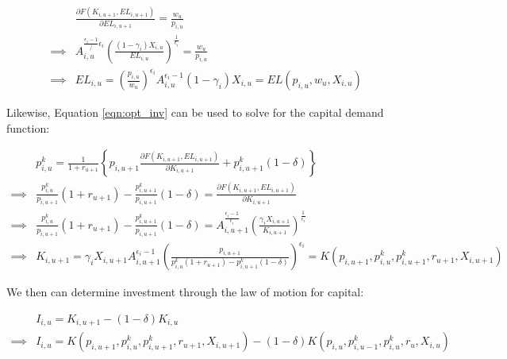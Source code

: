\documentclass[letterpaper,12pt]{article}
\theoremstyle{definition}
\begin{document}
\begin{spacing}{1.5}
\begin{equation}
\label{eqn:solve_dyn_l}
\begin{split}
 &\frac{\partial F(K_{i,u+1},EL_{i,u+1})}{\partial EL_{i,u+1}} =  \frac{w_{u}}{ p_{i,u}}  \\
 \implies & A_{i,u}^{\frac{\epsilon_{i}-1}/{\epsilon_{i}}}\left( \frac{(1-\gamma_{i})X_{i,u}}{EL_{i,u}}\right)^{\frac{1}{\epsilon_{i}}} =   \frac{w_{u}}{ p_{i,u}} \\
\implies & EL_{i,u} = \left( \frac{ p_{i,u}}{w_{u}}\right)^{\epsilon_{i}}A_{i,u}^{\epsilon_{i}-1}(1-\gamma_{i})X_{i,u} = EL(p_{i,u},w_{u},X_{i,u})
\end{split}
\end{equation}

Likewise, Equation \ref{eqn:opt_inv} can be used to solve for the capital demand function:

\begin{equation}
\label{eqn:solve_dyn_k}
\begin{split}
 &p^{k}_{i,u} =  \frac{1}{1+r_{u+1}} \left\{p_{i,u+1}\frac{\partial F(K_{i,u+1},EL_{i,u+1})}{\partial K_{i,u+1}}+ p^{k}_{i,u+1}(1-\delta)  \right\}  \\
 \implies & \frac{p^{k}_{i,u}}{p_{i,u+1}}(1+r_{u+1}) - \frac{p^{k}_{i,u+1}}{p_{i,u+1}}(1-\delta) =\frac{\partial F(K_{i,u+1},EL_{i,u+1})}{\partial K_{i,u+1}} \\
\implies & \frac{p^{k}_{i,u}}{p_{i,u+1}}(1+r_{u+1}) - \frac{p^{k}_{i,u+1}}{p_{i,u+1}}(1-\delta) =A_{i,u+1}^{\frac{\epsilon_{i}-1}{\epsilon_{i}}} \left( \frac{\gamma_{i}X_{i,u+1}}{K_{i,u+1}}\right)^{\frac{1}{\epsilon_{i}}} \\
\implies & K_{i,u+1} = \gamma_{i}X_{i,u+1}A_{i,u+1}^{\epsilon_{i}-1} \left(\frac{p_{i,u+1}}{p^{k}_{i,u}(1+r_{u+1}) - p^{k}_{i,u+1}(1-\delta)} \right)^{\epsilon_{i}} = K(p_{i,u+1},p^{k}_{i,u},p^{k}_{i,u+1},r_{u+1},X_{i,u+1})
\end{split}
\end{equation}

We then can determine investment through the law of motion for capital:

\begin{equation}
\label{eqn:solve_dyn_i}
\begin{split}
 &I_{i,u} = K_{i,u+1} - (1-\delta)K_{i,u} \\
\implies & I_{i,u} = K(p_{i,u+1},p^{k}_{i,u},p^{k}_{i,u+1},r_{u+1},X_{i,u+1}) - (1-\delta)K(p_{i,u},p^{k}_{i,u-1},p^{k}_{i,u},r_{u},X_{i,u}) 
\end{split}
\end{equation}


\end{spacing}
\end{document}
